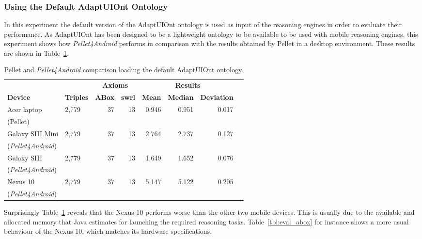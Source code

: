 \subsubsection{Using the Default AdaptUIOnt Ontology}
\label{sec:eval_default_ont}

In this experiment the default version of the AdaptUIOnt ontology is used as 
input of the reasoning engines in order to evaluate their performance. As 
AdaptUIOnt has been designed to be a lightweight ontology to be available to be 
used with mobile reasoning engines, this experiment shows how \textit{Pellet4Android} 
performs in comparison with the results obtained by Pellet in a desktop 
environment. These results are shown in Table~\ref{tbl:eval_default_ont}.

\begin{table}
 \caption{Pellet and \textit{Pellet4Android} comparison loading the default 
AdaptUIOnt ontology.}
 \label{tbl:eval_default_ont}
 \footnotesize
 \centering
  \begin{tabular}{l l r r r r r r}
  \hline 
  &  & \multicolumn{2}{c}{\textbf{Axioms}} & 
  \multicolumn{3}{c}{\textbf{Results}}	\\
  \textbf{Device} & \textbf{Triples}& \textbf{ABox} & \textbf{\ac{swrl}}
  & \textbf{Mean} & \textbf{Median} & \textbf{Deviation}	\\
  \hline 
  Acer laptop	& 2,779	& 37  & 13 & 0.946 & 0.951 & 0.017	\\
  (Pellet)							\\
  Galaxy SIII Mini& 2,779& 37 & 13 & 2.764 & 2.737 & 0.127	\\
  (\textit{Pellet4Android})					\\
  Galaxy SIII	& 2,779	& 37  & 13 & 1.649 & 1.652 & 0.076	\\
  (\textit{Pellet4Android})					\\
  Nexus 10	& 2,779	& 37  & 13 & 5.147 & 5.122 & 0.205	\\
  (\textit{Pellet4Android})					\\
  \hline
\end{tabular}
\end{table}

Surprisingly Table~\ref{tbl:eval_default_ont} reveals that the Nexus 10 performs
worse than the other two mobile devices. This is usually due to the available
and allocated memory that Java estimates for launching the required reasoning
tasks. Table~\ref{tbl:eval_abox} for instance shows a more usual behaviour of
the Nexus 10, which matches its hardware specifications.

